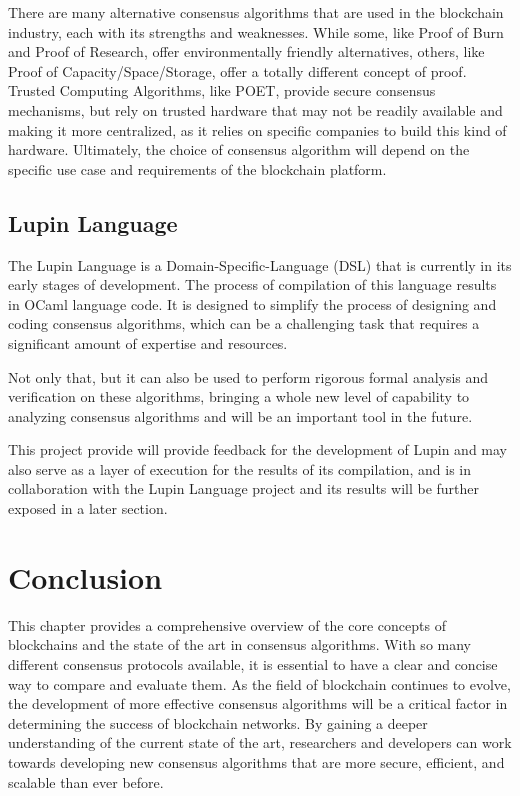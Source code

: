 There are many alternative consensus algorithms that are used in the blockchain industry, each with its strengths and weaknesses.
While some, like Proof of Burn and Proof of Research, offer environmentally friendly alternatives, others, like Proof of Capacity/Space/Sto\-rage, offer a totally different concept of proof.
Trusted Computing Algorithms, like POET, provide secure consensus mechanisms, but rely on trusted hardware that may not be readily available and making it more centralized, as it relies on specific companies to build this kind of hardware.
Ultimately, the choice of consensus algorithm will depend on the specific use case and requirements of the blockchain platform.





\subsection*{\textbf{Lupin Language}}
\label{lupin}

The Lupin Language is a Domain-Specific-Language (DSL) that is currently in its early stages of development. 
The process of compilation of this language results in OCaml language code.
It is designed to simplify the process of designing and coding consensus algorithms, which can be a challenging task that requires a significant amount of expertise and resources.

Not only that, but it can also be used to perform rigorous formal analysis and verification on these algorithms, bringing 
a whole new level of capability to analyzing consensus algorithms and will be an important tool in the future.

This project provide will provide feedback for the development of Lupin and may also serve as a layer of execution for the results of its compilation, and is in collaboration with the Lupin Language project and its results will be further exposed in a later section.



\section{Conclusion}
This chapter provides a comprehensive overview of the core concepts of blockchains and the state of the art in consensus algorithms. With so many different consensus protocols available, it is essential to have a clear and concise way to compare and evaluate them. As the field of blockchain continues to evolve, the development of more effective consensus algorithms will be a critical factor in determining the success of blockchain networks. By gaining a deeper understanding of the current state of the art, researchers and developers can work towards developing new consensus algorithms that are more secure, efficient, and scalable than ever before.
